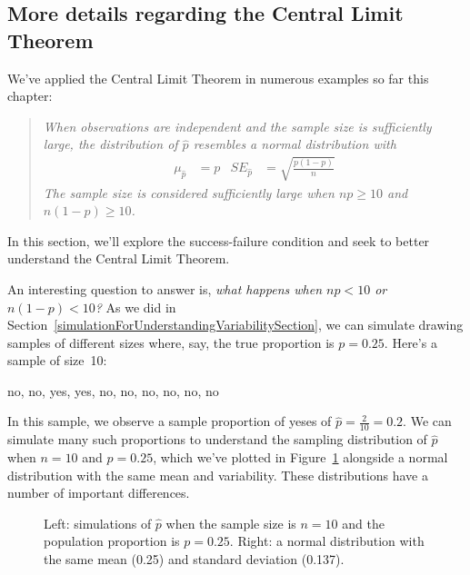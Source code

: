 \D{\newpage}

\subsection{More details regarding the Central Limit Theorem}

\noindent%
We've applied the Central Limit Theorem in numerous examples
so far this chapter:
\begin{quote}{\em
When observations are independent and the sample size is
sufficiently large, the distribution of $\hat{p}$ resembles
a normal distribution with
\begin{align*}
  \mu_{\hat{p}} &= p
  &SE_{\hat{p}} &= \sqrt{\frac{p (1 - p)}{n}}
\end{align*}
The sample size is considered sufficiently large
when $n p \geq 10$ and $n (1 - p) \geq 10$.
}\end{quote}
In this section, we'll explore the success-failure
condition and seek to better understand the
Central Limit Theorem.

An interesting question to answer is, \emph{what happens when
$np < 10$ or $n(1-p) < 10$?} As we did in
Section~\ref{simulationForUnderstandingVariabilitySection},
we can simulate drawing samples of different sizes where,
say, the true proportion is $p = 0.25$.
Here's a sample of size~10:
\begin{center}
no, no, yes, yes, no, no, no, no, no, no
\end{center}
In this sample, we observe a sample proportion of yeses
of $\hat{p} = \frac{2}{10} = 0.2$. We can simulate many such
proportions to understand the sampling distribution of
$\hat{p}$ when $n = 10$ and $p = 0.25$, which we've plotted
in Figure~\ref{sampling_10_prop_25p}
alongside a normal distribution with the
same mean and variability.
These distributions have a number of important differences.

\begin{figure}[h]
   \centering
   \caption{Left: simulations of $\hat{p}$ when the sample size
       is $n = 10$ and the population proportion is $p = 0.25$.
       Right: a normal distribution with the same mean (0.25)
       and standard deviation (0.137).}
   \label{sampling_10_prop_25p}
\end{figure}

